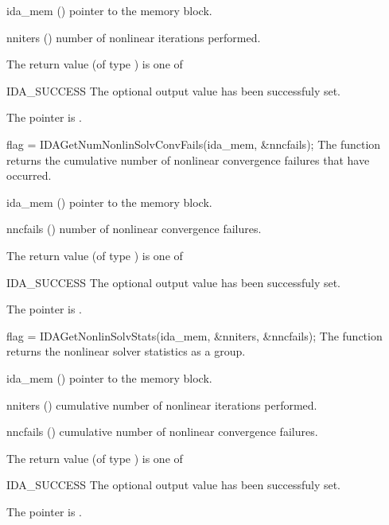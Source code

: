 {
  \begin{args}[nniters]
  \item[ida\_mem] ()
    pointer to the {\ida} memory block.
  \item[nniters] ()
    number of nonlinear iterations performed.
  \end{args}
}
{
  The return value  (of type ) is one of
  \begin{args}
  \item[IDA\_SUCCESS] 
    The optional output value has been successfuly set.
  \item[\Id{IDA\_MEM\_NULL}]
    The  pointer is .
  \end{args}
}
{}
{
  flag = IDAGetNumNonlinSolvConvFails(ida\_mem, \&nncfails);
}
{
  The function  returns the
  cumulative number of nonlinear convergence failures that have occurred.
}
{
  \begin{args}[nncfails]
  \item[ida\_mem] ()
    pointer to the {\ida} memory block.
  \item[nncfails] ()
    number of nonlinear convergence failures.
  \end{args}
}
{
  The return value  (of type ) is one of
  \begin{args}
  \item[IDA\_SUCCESS] 
    The optional output value has been successfuly set.
  \item[\Id{IDA\_MEM\_NULL}]
    The  pointer is .
  \end{args}
}
{}
{
  flag = IDAGetNonlinSolvStats(ida\_mem, \&nniters, \&nncfails);
}
{
  The function  returns the
  {\ida} nonlinear solver statistics as a group.
}
{
  \begin{args}[nncfails]
  \item[ida\_mem] ()
    pointer to the {\ida} memory block.
  \item[nniters] ()
    cumulative number of nonlinear iterations performed.
  \item[nncfails] ()
    cumulative number of nonlinear convergence failures.
  \end{args}
}
{
  The return value  (of type ) is one of
  \begin{args}
  \item[IDA\_SUCCESS] 
    The optional output value has been successfuly set.
  \item[\Id{IDA\_MEM\_NULL}]
    The  pointer is .
  \end{args}
}
{}

